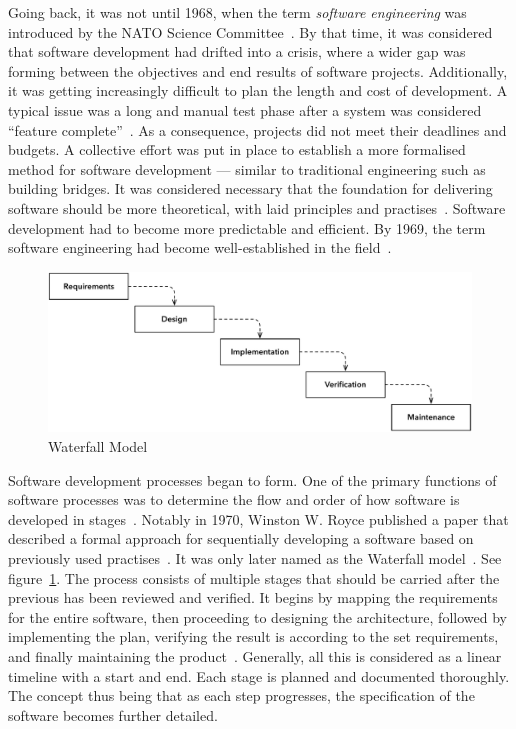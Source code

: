 \documentclass[english]{tktltiki2}
\begin{document}
Going back, it was not until 1968, when the term \emph{software engineering} was introduced by the NATO Science Committee~\cite{NR69}. By that time, it was considered that software development had drifted into a crisis, where a wider gap was forming between the objectives and end results of software projects. Additionally, it was getting increasingly difficult to plan the length and cost of development. A typical issue was a long and manual test phase after a system was considered “feature complete”~\cite{Fow05}. As a consequence, projects did not meet their deadlines and budgets. A collective effort was put in place to establish a more formalised method for software development — similar to traditional engineering such as building bridges. It was considered necessary that the foundation for delivering software should be more theoretical, with laid principles and practises~\cite{NR69}. Software development had to become more predictable and efficient. By 1969, the term software engineering had become well-established in the field~\cite{BR70}.

\begin{figure}[h!]

    \centering
    \vspace{1cm}

    \includegraphics[width = \textwidth]{figures/waterfall-model}

    \caption{Waterfall Model}
    \label{figure:waterfall-model}

    \vspace{1cm}

\end{figure}

Software development processes began to form. One of the primary functions of software processes was to determine the flow and order of how software is developed in stages~\cite{Boe88}. Notably in 1970, Winston W. Royce published a paper that described a formal approach for sequentially developing a software based on previously used practises~\cite{Roy70}. It was only later named as the Waterfall model~\cite{Boe88, LB03}. See figure~\ref{figure:waterfall-model}. The process consists of multiple stages that should be carried after the previous has been reviewed and verified. It begins by mapping the requirements for the entire software, then proceeding to designing the architecture, followed by implementing the plan, verifying the result is according to the set requirements, and finally maintaining the product~\cite{Roy70}. Generally, all this is considered as a linear timeline with a start and end. Each stage is planned and documented thoroughly. The concept thus being that as each step progresses, the specification of the software becomes further detailed.
\end{document}
